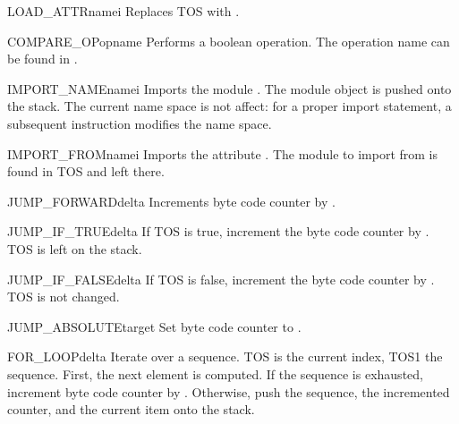 \begin{funcdesc}{LOAD_ATTR}{namei}
Replaces TOS with .
\end{funcdesc}

\begin{funcdesc}{COMPARE_OP}{opname}
Performs a boolean operation.  The operation name can be found
in .
\end{funcdesc}

\begin{funcdesc}{IMPORT_NAME}{namei}
Imports the module .  The module object is
pushed onto the stack.  The current name space is not affect: for a
proper import statement, a subsequent  instruction
modifies the name space.
\end{funcdesc}

\begin{funcdesc}{IMPORT_FROM}{namei}
Imports the attribute .  The module to import
from is found in TOS and left there.
\end{funcdesc}

\begin{funcdesc}{JUMP_FORWARD}{delta}
Increments byte code counter by .
\end{funcdesc}

\begin{funcdesc}{JUMP_IF_TRUE}{delta}
If TOS is true, increment the byte code counter by .  TOS is
left on the stack.
\end{funcdesc}

\begin{funcdesc}{JUMP_IF_FALSE}{delta}
If TOS is false, increment the byte code counter by .  TOS
is not changed. 
\end{funcdesc}

\begin{funcdesc}{JUMP_ABSOLUTE}{target}
Set byte code counter to .
\end{funcdesc}

\begin{funcdesc}{FOR_LOOP}{delta}
Iterate over a sequence.  TOS is the current index, TOS1 the sequence.
First, the next element is computed.  If the sequence is exhausted,
increment byte code counter by .  Otherwise, push the
sequence, the incremented counter, and the current item onto the stack.
\end{funcdesc}


